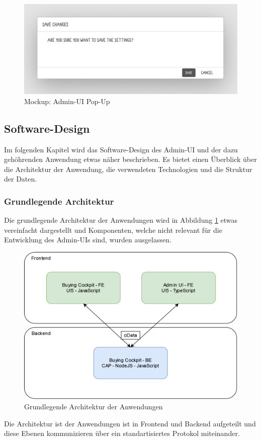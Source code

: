 \begin{figure}[H]
    \centering
    \includegraphics[width=\linewidth]{Images/Mockup_PopUp.png}
    \caption[Mockup: Admin-UI Pop-Up]{Mockup: Admin-UI Pop-Up}
\end{figure}

\subsection[Software-Design]{Software-Design}
Im folgenden Kapitel wird das Software-Design des Admin-UI und der dazu gehöhrenden Anwendung etwas näher beschrieben.
Es bietet einen Überblick über die Architektur der Anwendung, die verwendeten Technologien und die Struktur der Daten.

\subsubsection[Grundlegende Architektur]{Grundlegende Architektur}
Die grundlegende Architektur der Anwendungen wird in Abbildung \ref{fig:architecture} etwas vereinfacht dargestellt und Komponenten, welche nicht relevant für die Entwicklung des Admin-UIs sind, wurden ausgelassen.

\begin{figure}[H]
    \centering
    \includegraphics[width=\linewidth]{Images/BE_Architecture.png}
    \caption[Grundlegende Architektur der Anwendungen]{Grundlegende Architektur der Anwendungen}
    \label{fig:architecture}
\end{figure}
Die Architektur ist der Anwendungen ist in Frontend und Backend aufgeteilt und diese Ebenen kommunizieren über ein standartisiertes Protokol miteinander.

